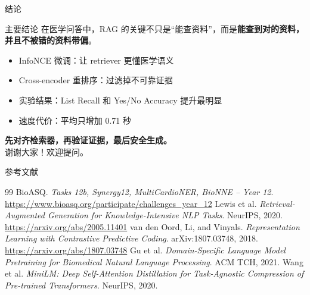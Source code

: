 \documentclass[aspectratio=169,10pt]{beamer}
\begin{document}
\begin{frame}{结论}
\begin{block}{主要结论}
在医学问答中，RAG 的关键不只是“能查资料”，而是\textbf{能查到对的资料，并且不被错的资料带偏}。
\end{block}

\vspace{0.5em}
\begin{itemize}
  \item InfoNCE 微调：让 retriever 更懂医学语义
  \item Cross-encoder 重排序：过滤掉不可靠证据
  \item 实验结果：List Recall 和 Yes/No Accuracy 提升最明显
  \item 速度代价：平均只增加 0.71 秒
\end{itemize}

\vfill
\begin{center}
\Large \textbf{先对齐检索器，再验证证据，最后安全生成。}\\[0.6em]
谢谢大家！欢迎提问。
\end{center}
\end{frame}

\begin{frame}[allowframebreaks]{参考文献}
\footnotesize
\begin{thebibliography}{99}
 BioASQ. \emph{Tasks 12b, Synergy12, MultiCardioNER, BioNNE -- Year 12}. \url{https://www.bioasq.org/participate/challenges_year_12}
 Lewis et al. \emph{Retrieval-Augmented Generation for Knowledge-Intensive NLP Tasks}. NeurIPS, 2020. \url{https://arxiv.org/abs/2005.11401}
 van den Oord, Li, and Vinyals. \emph{Representation Learning with Contrastive Predictive Coding}. arXiv:1807.03748, 2018. \url{https://arxiv.org/abs/1807.03748}
 Gu et al. \emph{Domain-Specific Language Model Pretraining for Biomedical Natural Language Processing}. ACM TCH, 2021.
 Wang et al. \emph{MiniLM: Deep Self-Attention Distillation for Task-Agnostic Compression of Pre-trained Transformers}. NeurIPS, 2020.
\end{thebibliography}
\end{frame}
\end{document}
